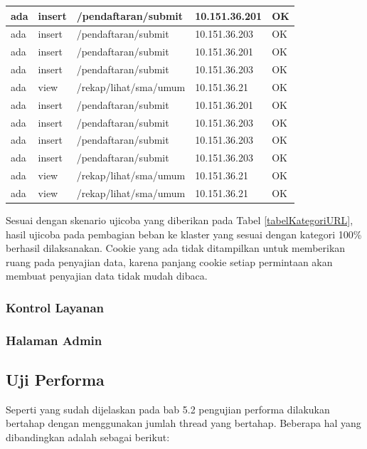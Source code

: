 \documentclass{ta-its}
\begin{document}
\begin{longtable}{|p{}|p{}|p{}|p{}|p{}|}
						ada & insert & /pendaftaran/submit & 10.151.36.201 & OK\\ \hline
						ada & insert & /pendaftaran/submit & 10.151.36.203 & OK\\ \hline
						ada & insert & /pendaftaran/submit & 10.151.36.201 & OK\\ \hline
						ada & insert & /pendaftaran/submit & 10.151.36.203 & OK\\ \hline
						ada & view & /rekap/lihat/sma/umum & 10.151.36.21 & OK\\ \hline
						ada & insert & /pendaftaran/submit & 10.151.36.201 & OK\\ \hline
						ada & insert & /pendaftaran/submit & 10.151.36.203 & OK\\ \hline
						ada & insert & /pendaftaran/submit & 10.151.36.203 & OK\\ \hline
						ada & insert & /pendaftaran/submit & 10.151.36.203 & OK\\ \hline
						ada & view & /rekap/lihat/sma/umum & 10.151.36.21 & OK\\ \hline
						ada & view & /rekap/lihat/sma/umum & 10.151.36.21 & OK\\ \hline
						
						
					\end{longtable}
					
					Sesuai dengan skenario ujicoba yang diberikan pada Tabel \ref{tabelKategoriURL}, hasil ujicoba pada pembagian beban ke klaster yang sesuai dengan kategori 100\% berhasil dilaksanakan. Cookie yang ada tidak ditampilkan untuk memberikan ruang pada penyajian data, karena panjang cookie setiap permintaan akan membuat penyajian data tidak mudah dibaca.
									
				\subsubsection{Kontrol Layanan}
				
				\subsubsection{Halaman Admin}
					
			
			\subsection{Uji Performa}
				Seperti yang sudah dijelaskan pada bab 5.2 pengujian performa dilakukan bertahap dengan menggunakan jumlah thread yang bertahap. Beberapa hal yang dibandingkan adalah sebagai berikut:
				
\end{document}
